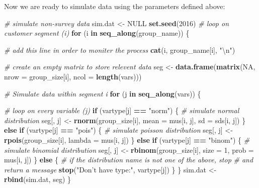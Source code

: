 \documentclass[12pt,]{krantz}
\makeatletter
\newenvironment{Shaded}{\begin{snugshade}}{\end{snugshade}}
\newcommand{\CharTok}[1]{\textcolor[rgb]{0.5,0.5,0.5}{#1}}
\newcommand{\CommentTok}[1]{\textcolor[rgb]{0.37,0.37,0.37}{\textit{#1}}}
\newcommand{\ControlFlowTok}[1]{\textcolor[rgb]{0.27,0.27,0.27}{\textbf{#1}}}
\newcommand{\DataTypeTok}[1]{\textcolor[rgb]{0.27,0.27,0.27}{#1}}
\newcommand{\DecValTok}[1]{\textcolor[rgb]{0.06,0.06,0.06}{#1}}
\newcommand{\KeywordTok}[1]{\textcolor[rgb]{0.27,0.27,0.27}{\textbf{#1}}}
\newcommand{\NormalTok}[1]{#1}
\newcommand{\OperatorTok}[1]{\textcolor[rgb]{0.43,0.43,0.43}{\textbf{#1}}}
\newcommand{\OtherTok}[1]{\textcolor[rgb]{0.37,0.37,0.37}{#1}}
\newcommand{\StringTok}[1]{\textcolor[rgb]{0.5,0.5,0.5}{#1}}
\newenvironment{kframe}{%
\medskip{}
\setlength{\fboxsep}{.8em}
 \def\at@end@of@kframe{}%
 \ifinner\ifhmode%
  \def\at@end@of@kframe{\end{minipage}}%
  \begin{minipage}{\columnwidth}%
 \fi\fi%
 \def\FrameCommand##1{\hskip\@totalleftmargin \hskip-\fboxsep
 \colorbox{shadecolor}{##1}\hskip-\fboxsep
     \hskip-\linewidth \hskip-\@totalleftmargin \hskip\columnwidth}%
 \MakeFramed {\advance\hsize-\width
   \@totalleftmargin\z@ \linewidth\hsize
   \@setminipage}}%
 {\par\unskip\endMakeFramed%
 \at@end@of@kframe}
\renewenvironment{Shaded}{\begin{kframe}}{\end{kframe}}
\makeatother
\begin{document}
Now we are ready to simulate data using the parameters defined above:

\begin{Shaded}
\begin{Highlighting}[]
\CommentTok{# simulate non-survey data}
\NormalTok{sim.dat <-}\StringTok{ }\OtherTok{NULL}
\KeywordTok{set.seed}\NormalTok{(}\DecValTok{2016}\NormalTok{)}
\CommentTok{# loop on customer segment (i)}
\ControlFlowTok{for}\NormalTok{ (i }\ControlFlowTok{in} \KeywordTok{seq_along}\NormalTok{(group_name)) \{}
    
    \CommentTok{# add this line in order to moniter the process}
    \KeywordTok{cat}\NormalTok{(i, group_name[i], }\StringTok{"}\CharTok{\textbackslash{}n}\StringTok{"}\NormalTok{)}
    
    \CommentTok{# create an empty matrix to store relevent data}
\NormalTok{    seg <-}\StringTok{ }\KeywordTok{data.frame}\NormalTok{(}\KeywordTok{matrix}\NormalTok{(}\OtherTok{NA}\NormalTok{, }\DataTypeTok{nrow =}\NormalTok{ group_size[i], }
    \DataTypeTok{ncol =} \KeywordTok{length}\NormalTok{(vars)))}
    
    \CommentTok{# Simulate data within segment i}
    \ControlFlowTok{for}\NormalTok{ (j }\ControlFlowTok{in} \KeywordTok{seq_along}\NormalTok{(vars)) \{}
        
        \CommentTok{# loop on every variable (j)}
        \ControlFlowTok{if}\NormalTok{ (vartype[j] }\OperatorTok{==}\StringTok{ "norm"}\NormalTok{) \{}
            \CommentTok{# simulate normal distribution}
\NormalTok{            seg[, j] <-}\StringTok{ }\KeywordTok{rnorm}\NormalTok{(group_size[i], }\DataTypeTok{mean =}\NormalTok{ mus[i, }
\NormalTok{                j], }\DataTypeTok{sd =}\NormalTok{ sds[i, j])}
\NormalTok{        \} }\ControlFlowTok{else} \ControlFlowTok{if}\NormalTok{ (vartype[j] }\OperatorTok{==}\StringTok{ "pois"}\NormalTok{) \{}
            \CommentTok{# simulate poisson distribution}
\NormalTok{            seg[, j] <-}\StringTok{ }\KeywordTok{rpois}\NormalTok{(group_size[i], }\DataTypeTok{lambda =}\NormalTok{ mus[i, }
\NormalTok{                j])}
\NormalTok{        \} }\ControlFlowTok{else} \ControlFlowTok{if}\NormalTok{ (vartype[j] }\OperatorTok{==}\StringTok{ "binom"}\NormalTok{) \{}
            \CommentTok{# simulate binomial distribution}
\NormalTok{            seg[, j] <-}\StringTok{ }\KeywordTok{rbinom}\NormalTok{(group_size[i], }\DataTypeTok{size =} \DecValTok{1}\NormalTok{, }
                \DataTypeTok{prob =}\NormalTok{ mus[i, j])}
\NormalTok{        \} }\ControlFlowTok{else}\NormalTok{ \{}
            \CommentTok{# if the distribution name is not one of the above, stop}
            \CommentTok{# and return a message}
            \KeywordTok{stop}\NormalTok{(}\StringTok{"Don't have type:"}\NormalTok{, vartype[j])}
\NormalTok{        \}}
\NormalTok{    \}}
\NormalTok{    sim.dat <-}\StringTok{ }\KeywordTok{rbind}\NormalTok{(sim.dat, seg)}
\NormalTok{\}}
\end{Highlighting}
\end{Shaded}
\end{document}
